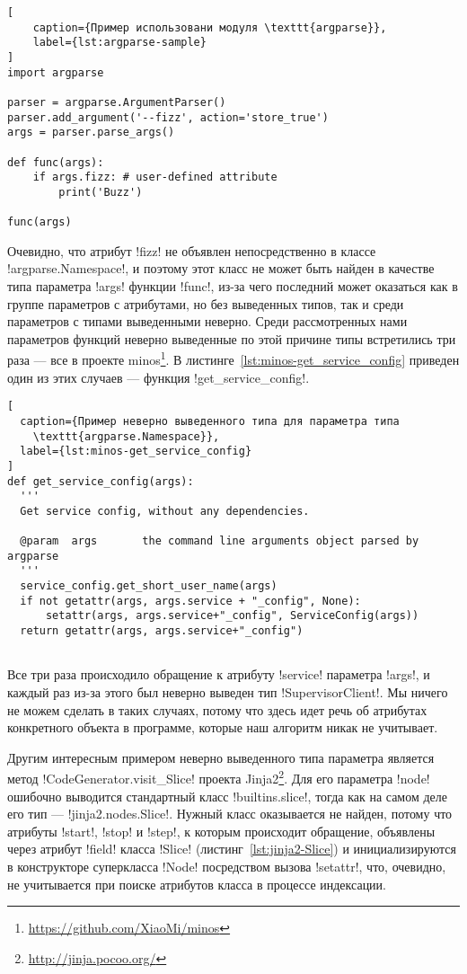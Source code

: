 \begin{lstlisting}[
    caption={Пример использовани модуля \texttt{argparse}},
    label={lst:argparse-sample}
]
import argparse

parser = argparse.ArgumentParser()
parser.add_argument('--fizz', action='store_true')
args = parser.parse_args()

def func(args):
    if args.fizz: # user-defined attribute
        print('Buzz')

func(args)
\end{lstlisting}

Очевидно, что атрибут !fizz! не объявлен непосредственно в классе
!argparse.Namespace!, и поэтому этот класс не может быть найден в качестве типа
параметра !args! функции !func!, из-за чего последний может оказаться как в
группе параметров с атрибутами, но без выведенных типов, так и среди параметров
с типами выведенными неверно. Среди рассмотренных нами параметров функций
неверно выведенные по этой причине типы встретились три раза --- все в проекте
minos\footnote{\url{https://github.com/XiaoMi/minos}}. В
листинге~\ref{lst:minos-get_service_config} приведен один из этих случаев ---
функция !get_service_config!.

\begin{lstlisting}[
  caption={Пример неверно выведенного типа для параметра типа
    \texttt{argparse.Namespace}},
  label={lst:minos-get_service_config}
]
def get_service_config(args):
  '''
  Get service config, without any dependencies.

  @param  args       the command line arguments object parsed by argparse
  '''
  service_config.get_short_user_name(args)
  if not getattr(args, args.service + "_config", None):
      setattr(args, args.service+"_config", ServiceConfig(args))
  return getattr(args, args.service+"_config")
    
\end{lstlisting}

Все три раза происходило обращение к атрибуту !service! параметра !args!, и
каждый раз из-за этого был неверно выведен тип !SupervisorClient!. Мы
ничего не можем сделать в таких случаях, потому что здесь идет речь об атрибутах
конкретного объекта в программе, которые наш алгоритм никак не учитывает.

Другим интересным примером неверно выведенного типа параметра является метод
!CodeGenerator.visit_Slice! проекта
Jinja2\footnote{\url{http://jinja.pocoo.org/}}. Для его параметра !node!
ошибочно выводится стандартный класс !builtins.slice!, тогда как на самом деле
его тип --- !jinja2.nodes.Slice!. Нужный класс оказывается не найден, потому что атрибуты
!start!, !stop! и !step!, к которым происходит обращение, объявлены через
атрибут !field! класса !Slice! (листинг~\ref{lst:jinja2-Slice}) и инициализируются в
конструкторе суперкласса !Node! посредством вызова !setattr!, что, очевидно, не
учитывается при поиске атрибутов класса в процессе индексации. 

